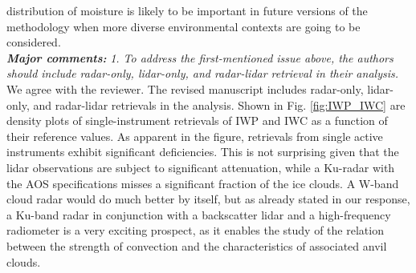 \documentclass[12pt]{article}
\begin{document}
distribution of moisture is likely to be important in future versions of the methodology when more diverse environmental contexts are going to be considered.\\
\newline
\textit{\textbf{Major comments:}}
\textit{1. To address the first-mentioned issue above, the authors should include radar-only, lidar-only, and radar-lidar 
    retrieval in their analysis.}\\
\newline
We agree with the reviewer. The revised manuscript includes radar-only, lidar-only, and radar-lidar retrievals in the analysis.  Shown 
in Fig. \ref{fig:IWP_IWC} are density plots of single-instrument retrievals of IWP and IWC as a function of their reference values.
As apparent in the figure, retrievals from single active instruments exhibit significant deficiencies.  This is not surprising given that
the lidar observations are subject to significant attenuation, while a Ku-radar with the AOS specifications misses a significant fraction of
the ice clouds. A W-band cloud radar would do much better by itself, but as already stated in our response, a Ku-band radar in conjunction
with a backscatter lidar and a high-frequency radiometer is a very exciting prospect, as it enables the study of the relation between 
the strength of convection and the characteristics of associated anvil clouds. \\
\end{document}
